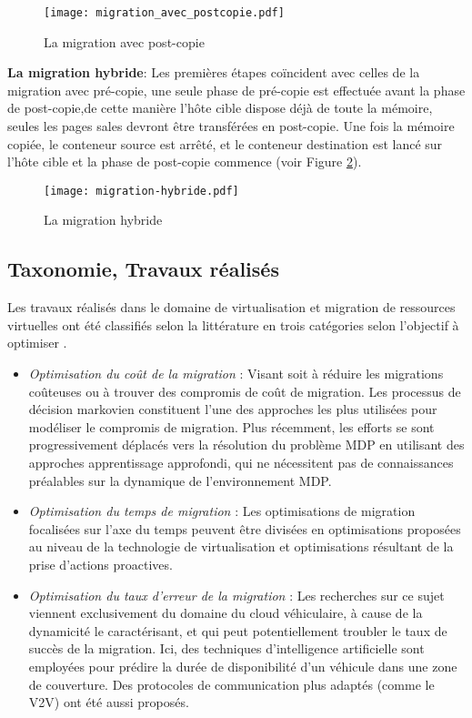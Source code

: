 \begin{figure}[H]
\centering
\texttt{[image: migration\_avec\_postcopie.pdf]}
\caption{La migration avec post-copie \cite{puliafito2019}}
\label{fig:migration_avec_postcopie2}
\end{figure}
\textbf{La migration hybride}: Les premières étapes coïncident avec celles de la migration avec pré-copie, une seule phase de pré-copie est effectuée avant la phase de post-copie,de cette manière l'hôte cible dispose déjà de toute la mémoire, seules les pages sales devront être transférées en post-copie. Une fois la mémoire copiée, le conteneur source est arrêté, et le conteneur destination est lancé sur l'hôte cible et la phase de post-copie commence \cite{wikimigration} (voir Figure \ref{fig:migration_hybride}).
\begin{figure}[H]
\centering
\texttt{[image: migration-hybride.pdf]}
\caption{La migration hybride \cite{puliafito2019}}
\label{fig:migration_hybride}
\end{figure}

\subsection{Taxonomie, Travaux réalisés}
Les travaux réalisés dans le domaine de virtualisation et migration de ressources virtuelles ont été classifiés selon la littérature en trois catégories selon l'objectif à optimiser \cite{rejiba2019}.
\begin{itemize}
  \item \emph{Optimisation du coût de la migration} : Visant soit à réduire les migrations coûteuses ou à trouver des compromis de coût de migration. Les processus de décision markovien constituent l'une des approches les plus utilisées pour modéliser le compromis de migration. Plus récemment, les efforts se sont progressivement déplacés vers la résolution du problème MDP en utilisant des approches apprentissage approfondi, qui ne nécessitent pas de connaissances préalables sur la dynamique de l'environnement MDP.
  \item \emph{Optimisation du temps de migration} : Les optimisations de migration focalisées sur l'axe du temps peuvent être divisées en optimisations proposées au niveau de la technologie de virtualisation et optimisations résultant de la prise d'actions proactives.
  \item \emph{Optimisation du taux d'erreur de la migration} : Les recherches sur ce sujet viennent exclusivement du domaine du cloud véhiculaire, à cause de la dynamicité le caractérisant, et qui peut potentiellement troubler le taux de succès de la migration. Ici, des techniques d'intelligence artificielle sont employées pour prédire la durée de disponibilité d'un véhicule dans une zone de couverture. Des protocoles de communication plus adaptés (comme le V2V) ont été aussi proposés.
\end{itemize}

